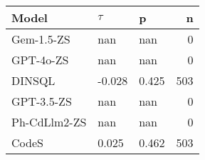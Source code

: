 \begin{tabular}{lllr}
\toprule
Model & $\tau$ & p & n \\
\midrule
Gem-1.5-ZS & nan & nan & 0 \\
GPT-4o-ZS & nan & nan & 0 \\
DINSQL & -0.028 & 0.425 & 503 \\
GPT-3.5-ZS & nan & nan & 0 \\
Ph-CdLlm2-ZS & nan & nan & 0 \\
CodeS & 0.025 & 0.462 & 503 \\
\bottomrule
\end{tabular}
